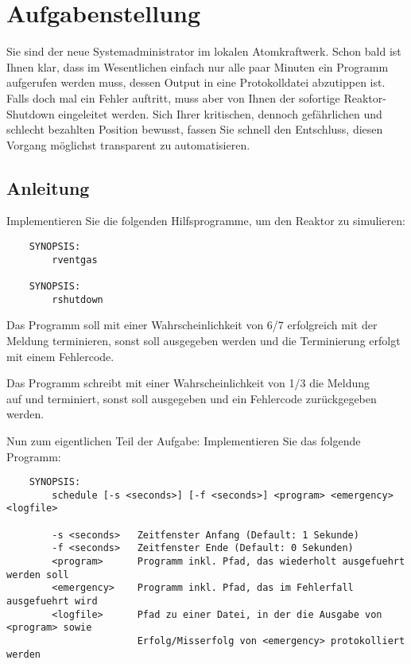 




\section*{Aufgabenstellung}

Sie sind der neue Systemadministrator im lokalen Atomkraftwerk. Schon bald ist
Ihnen klar, dass im Wesentlichen einfach nur alle paar Minuten ein Programm
aufgerufen werden muss, dessen Output in eine Protokolldatei abzutippen ist.
Falls doch mal ein Fehler auftritt, muss aber von Ihnen der sofortige
Reaktor-Shutdown eingeleitet werden. Sich Ihrer kritischen, dennoch gefährlichen
und schlecht bezahlten Position bewusst, fassen Sie schnell den Entschluss,
diesen Vorgang möglichst transparent zu automatisieren.

\subsection*{Anleitung}
Implementieren Sie die folgenden Hilfsprogramme, um den Reaktor zu simulieren:

\begin{verbatim}
    SYNOPSIS:
        rventgas

    SYNOPSIS:
        rshutdown
\end{verbatim}

Das Programm  soll mit einer Wahrscheinlichkeit von 6/7
erfolgreich mit der Meldung  terminieren, sonst soll
 ausgegeben werden
und die Terminierung erfolgt mit einem Fehlercode.

Das Programm  schreibt mit einer Wahrscheinlichkeit von 1/3
die Meldung\\
 auf  und terminiert, sonst
soll  ausgegeben und ein Fehlercode zurückgegeben werden.

Nun zum eigentlichen Teil der Aufgabe: Implementieren Sie das folgende Programm:

\begin{verbatim}
    SYNOPSIS:
        schedule [-s <seconds>] [-f <seconds>] <program> <emergency> <logfile>

        -s <seconds>   Zeitfenster Anfang (Default: 1 Sekunde)
        -f <seconds>   Zeitfenster Ende (Default: 0 Sekunden)
        <program>      Programm inkl. Pfad, das wiederholt ausgefuehrt werden soll
        <emergency>    Programm inkl. Pfad, das im Fehlerfall ausgefuehrt wird
        <logfile>      Pfad zu einer Datei, in der die Ausgabe von <program> sowie
                       Erfolg/Misserfolg von <emergency> protokolliert werden
\end{verbatim}

